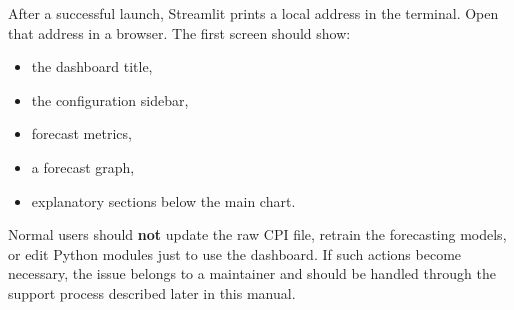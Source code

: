 After a successful launch, Streamlit prints a local address in the terminal. Open that address in a browser. The first screen should show:

\begin{itemize}
    \item the dashboard title,
    \item the configuration sidebar,
    \item forecast metrics,
    \item a forecast graph,
    \item explanatory sections below the main chart.
\end{itemize}

\begin{tcolorbox}[colback=orange!5!white, colframe=orange!75!black, title=Important Usage Note]
Normal users should \textbf{not} update the raw CPI file, retrain the forecasting models, or edit Python modules just to use the dashboard. If such actions become necessary, the issue belongs to a maintainer and should be handled through the support process described later in this manual.
\end{tcolorbox}
